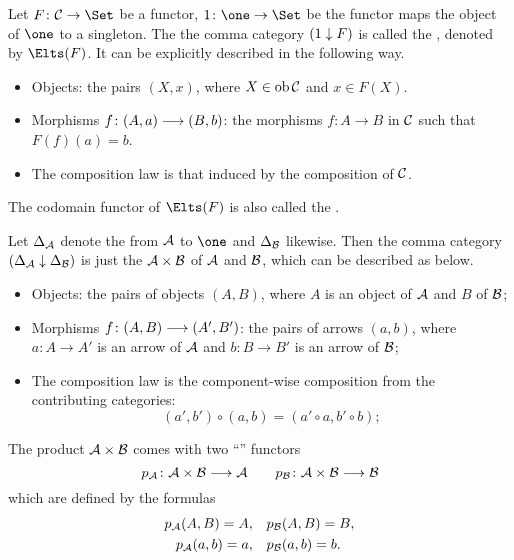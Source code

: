   \begin{exam}\label{exam:Elts}
    Let $F\colon\Cc\to\Set$ be a functor, $1\colon\one\to\Set$ be the functor maps the object of $\one$ to a singleton. The the comma category $(1\downarrow F)$ is called the , denoted by $\Elts(F)$. It can be explicitly described in the following way.
  \begin{itemize}
    \item Objects: the pairs $(X,x)$, where $X\in\operatorname{ob}{\cal C}$ and $x\in F(X)$.
    \item Morphisms $f\colon(A,a)\longrightarrow(B,b)$:
               the morphisms $f\colon A\to B$ in ${\cal C}$ such that $F(f)(a)=b$.
    \item The composition law is that induced by the composition of ${\cal C}$.
  \end{itemize}
  The codomain functor of $\Elts(F)$ is also called the .
  \end{exam}

  \begin{exam}
    Let $\Delta_{{\cal A}}$ denote the  from ${\cal A}$ to $\one$ and $\Delta_{{\cal B}}$ likewise. Then the comma category $(\Delta_{{\cal A}}\downarrow\Delta_{{\cal B}})$ is just the  ${\cal A}\times{\cal B}$ of ${\cal A}$ and ${\cal B}$, which can be described as below.
  \begin{itemize}
    \item Objects:
               the pairs of objects $(A, B)$, where $A$ is an object of ${\cal A}$ and $B$ of ${\cal B}$;
    \item Morphisms $f\colon(A,B)\longrightarrow(A',B')$:
               the pairs of arrows $(a,b)$, where $a\colon A\to A'$ is an arrow of ${\cal A}$ and $b\colon B\to B'$ is an arrow of ${\cal B}$;
    \item The composition law is the component-wise composition from the contributing categories:
                                    \begin{equation*}
                                      (a', b') \circ (a, b) = (a' \circ a, b' \circ b);
                                    \end{equation*}
  \end{itemize}
  \end{exam}
  The product ${\cal A}\times{\cal B}$ comes with two ``'' functors
  \begin{equation*}
    p_{{\cal A}}\colon{\cal A}\times{\cal B}\longrightarrow{\cal A}\qquad p_{{\cal B}}\colon{\cal A}\times{\cal B}\longrightarrow{\cal B}
  \end{equation*}
  which are defined by the formulas
  \begin{align*}
    p_{{\cal A}}(A,B)=A,&\quad p_{{\cal B}}(A,B) = B,\\
    p_{{\cal A}}(a,b) =a,&\quad p_{{\cal B}}(a,b) = b.
  \end{align*}

